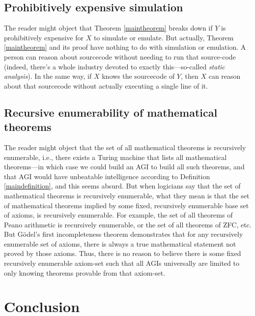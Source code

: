 \documentclass[runningheads]{llncs}
\begin{document}
\subsection{Prohibitively expensive simulation}

The reader might object that Theorem \ref{maintheorem} breaks down if $Y$ is prohibitively
expensive for $X$ to simulate or emulate. But actually, Theorem \ref{maintheorem} and its
proof have nothing to do with simulation or emulation. A person can reason about sourcecode
without needing to run that source-code (indeed, there's a whole industry devoted to
exactly this---so-called \emph{static analysis}). In the same way, if $X$ knows the sourcecode
of $Y$, then $X$ can reason about that sourcecode without actually executing a single line
of it.

\subsection{Recursive enumerability of mathematical theorems}

The reader might object that the set of all mathematical theorems is recursively enumerable,
i.e., there exists a Turing machine that lists all mathematical theorems---in which case we
could build an AGI to build all such theorems, and that AGI would have unbeatable intelligence
according to Definition \ref{maindefinition}, and this seems absurd.
But when logicians say that the set of mathematical theorems is recursively enumerable,
what they mean is that the set of mathematical theorems implied by some fixed, recursively
enumerable base set of axioms, is recursively enumerable. For example, the set of all
theorems of Peano arithmetic is recursively enumerable, or the set of all theorems of
ZFC, etc. But G\"odel's first incompleteness theorem demonstrates that for any recursively
enumerable set of axioms, there is always a true mathematical statement not proved by
those axioms. Thus, there is no reason to believe there is some fixed recursively enumerable
axiom-set such that all AGIs universally are limited to only knowing theorems provable
from that axiom-set.

\section{Conclusion}





\end{document}
